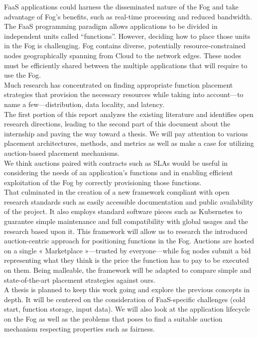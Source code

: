 \Gls{FaaS} applications could harness the disseminated nature of the Fog and take advantage of Fog’s benefits, such as real-time processing and reduced bandwidth. The \gls{FaaS} programming paradigm allows applications to be divided in independent units called “functions”. However, deciding how to place those units in the Fog is challenging. Fog contains diverse, potentially resource-constrained nodes geographically spanning from Cloud to the network edges. These nodes must be efficiently shared between the multiple applications that will require to use the Fog.\\
Much research has concentrated on finding appropriate function placement strategies that provision the necessary resources while taking into account—to name a few—distribution, data locality, and latency. \\
The first portion of this report analyzes the existing literature and identifies open research directions, leading to the second part of this document about the internship and paving the way toward a thesis. We will pay attention to various placement architectures, methods, and metrics as well as make a case for utilizing auction-based placement mechanisms. \\
We think auctions paired with contracts such as \glspl{SLA} would be useful in considering the needs of an application’s functions and in enabling efficient exploitation of the Fog by correctly provisioning those functions.\\
That culminated in the creation of a new framework compliant with open research standards such as easily accessible documentation and public availability of the project. It also employs standard software pieces such as Kubernetes to guarantee simple maintenance and full compatibility with global usages and the research based upon it. This framework will allow us to research the introduced auction-centric approach for positioning functions in the Fog. Auctions are hosted on a single « Marketplace »—trusted by everyone—while fog nodes submit a bid representing what they think is the price the function has to pay to be executed on them. Being malleable, the framework will be adapted to compare simple and state-of-the-art placement strategies against ours.\\
A thesis is planned to keep this work going and explore the previous concepts in depth. It will be centered on the consideration of \gls{FaaS}-specific challenges (cold start, function storage, input data). We will also look at the application lifecycle on the Fog as well as the problems that poses to find a suitable auction mechanism respecting properties such as fairness.
